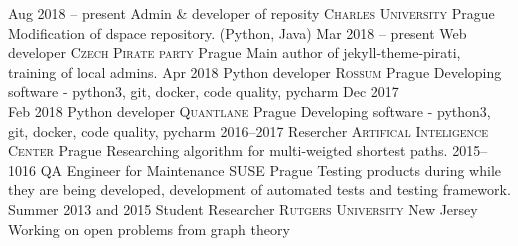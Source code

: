 \cventry
    {Aug 2018 -- present}
    {Admin \& developer of reposity}
    {\textsc{Charles University}}
    {Prague}
    {}
    {Modification of dspace repository. (Python, Java)}
\cventry
    {Mar 2018 -- present}
    {Web developer}
    {\textsc{Czech Pirate party}}
    {Prague}
    {}
    {Main author of jekyll-theme-pirati, training of local admins.}
\cventry
    {Apr 2018}
    {Python developer}
    {\textsc{Rossum}}
    {Prague}
    {}
    {Developing software - python3, git, docker, code quality, pycharm}
\cventry
    {Dec 2017 \\ Feb 2018}
    {Python developer}
    {\textsc{Quantlane}}
    {Prague}
    {}
    {Developing software - python3, git, docker, code quality, pycharm}
\cventry
    {2016--2017}
    {Resercher}
    {\textsc{Artifical Inteligence Center}}
    {Prague}
    {}
    {Researching algorithm for multi-weigted shortest paths.}
\cventry
    {2015--1016}
    {QA Engineer for Maintenance}
    {\textsc{SUSE}}
    {Prague}
    {}
    {Testing products during while they are being developed, development of automated tests and testing framework.}
\cventry
    {Summer 2013 and 2015}
    {Student Researcher}
    {\textsc{Rutgers University}}
    {New Jersey}
    {}
    {Working on open problems from graph theory} 




